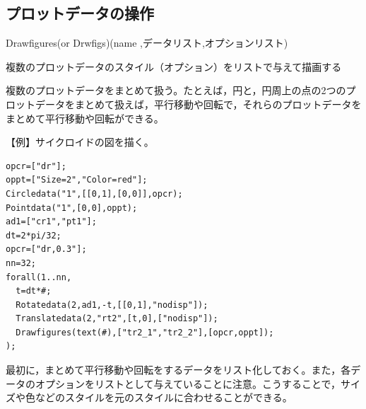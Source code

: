 \documentclass[papersize,a4paper,12pt,uplatex]{jsarticle}
\begin{document}
\subsection{プロットデータの操作}
\begin{description}

\hypertarget{drawfigures}{}
\item[関数]Drawfigures(or Drwfigs)(name ,データリスト,オプションリスト)
\item[機能]複数のプロットデータのスタイル（オプション）をリストで与えて描画する
\item[説明]複数のプロットデータをまとめて扱う。たとえば，円と，円周上の点の2つのプロットデータをまとめて扱えば，平行移動や回転で，それらのプロットデータをまとめて平行移動や回転ができる。%


\vspace{\baselineskip}
【例】サイクロイドの図を描く。
\begin{verbatim}
opcr=["dr"];
oppt=["Size=2","Color=red"];
Circledata("1",[[0,1],[0,0]],opcr);
Pointdata("1",[0,0],oppt);
ad1=["cr1","pt1"];
dt=2*pi/32;
opcr=["dr,0.3"];
nn=32;
forall(1..nn,
  t=dt*#;
  Rotatedata(2,ad1,-t,[[0,1],"nodisp"]);
  Translatedata(2,"rt2",[t,0],["nodisp"]);
  Drawfigures(text(#),["tr2_1","tr2_2"],[opcr,oppt]);
);
\end{verbatim}

\vspace{\baselineskip}
\hspace{20mm}  

最初に，まとめて平行移動や回転をするデータをリスト化しておく。また，各データのオプションをリストとして与えていることに注意。こうすることで，サイズや色などのスタイルを元のスタイルに合わせることができる。


\end{description}
\end{document}
